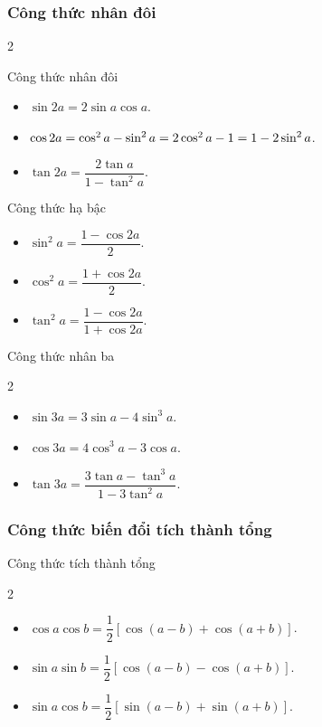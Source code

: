 \subsubsection{Công thức nhân đôi}
\begin{multicols}{2}
	\begin{khung4}{Công thức nhân đôi}
		\begin{itemize}
			\item $\sin 2a = 2\sin a \cos a$.
			\item $\cos 2a = \cos^2a-\sin^2a \\= 2\cos^2a-1 = 1-2\sin^2a$.
			\item $\tan 2a = \dfrac{2\tan a}{1-\tan^2a}$.
		\end{itemize}
	\end{khung4}
	\begin{khung4}{Công thức hạ bậc}
		\begin{itemize}
			\item $\sin^2a= \dfrac{1-\cos 2a}{2}$.
			\item $\cos^2a = \dfrac{1+\cos 2a}{2}$.
			\item $\tan^2a=\dfrac{1-\cos2a}{1+\cos 2a}$.
		\end{itemize}
	\end{khung4}
\end{multicols}

\begin{khung4}{Công thức nhân ba}
	\begin{multicols}{2}
		\begin{itemize}
			\item $\sin3a= 3\sin a -4\sin^3a$.
			\item $\cos3a= 4\cos^3a-3\cos a$.
			\item $\tan3a = \dfrac{3\tan a - \tan^3 a}{1-3\tan^2a}$.
		\end{itemize}
	\end{multicols}
\end{khung4}

\subsubsection{Công thức biến đổi tích thành tổng}
\begin{khung4}{Công thức tích thành tổng}
	\begin{multicols}{2}
		\begin{itemize}
			\item $\cos a \cos b = \dfrac{1}{2}\left[\cos (a-b) + \cos (a+b)\right]$.
			\item $\sin a \sin b = \dfrac{1}{2}\left[\cos (a-b)-\cos(a+b)\right]$.
			\item $\sin a \cos b = \dfrac{1}{2}\left[\sin (a-b)+\sin (a+b)\right]$.
		\end{itemize}
	\end{multicols}
\end{khung4}
